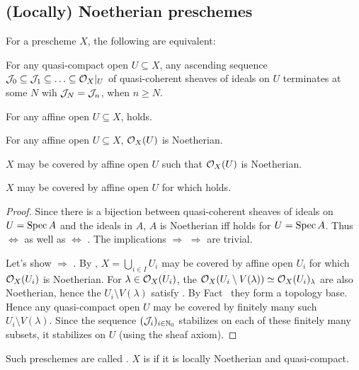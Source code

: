 \documentclass[a4paper,parskip=half,numbers=enddot, DIV=12]{scrreprt}
\begin{document}
\subsection{(Locally) Noetherian preschemes}

\begin{prop}
    For a prescheme $X$, the following are equivalent:
    \begin{alphanumerate}
    \item 
        For any quasi-compact open $U\subseteq X$, any ascending sequence $\mathcal{J}_0\subseteq \mathcal{J}_1\subseteq\ldots \subseteq \mathcal{O}_X|_U$ of quasi-coherent sheaves of ideals on $U$ terminates at some $N$ wih $\mathcal{J}_N= \mathcal{J}_n$, when $n\geq N$.
    \item 
        For any affine open $U\subseteq X$,  holds.
    \item 
        For any affine open $U\subseteq X$, $\mathcal{O}_X(U)$ is Noetherian.
    \item  
        $X$ may be covered by affine open $U$ such that $\mathcal{O}_X(U)$ is Noetherian.
    \item   
        $X$ may be covered by affine open $U$ for which  holds.
    \end{alphanumerate}
\end{prop}
\begin{proof}
    Since there is a bijection between quasi-coherent sheaves of ideals on $U=\operatorname{Spec} A$ and the ideals in $A$, $A$ is Noetherian iff  holds for $U=\operatorname{Spec} A$. Thus  $\Leftrightarrow$  as well as  $\Leftrightarrow$ . The implications  $\Rightarrow$  $\Rightarrow$  are trivial.  
    
    Let's show  $\Rightarrow$ . By , $X=\bigcup_{i\in I}U_i$ may be covered by affine open $U_i$ for which $\mathcal{O}_X(U_i)$ is Noetherian. For $\lambda\in\mathcal{O}_X(U_i)$, the $\mathcal{O}_X(U_i\setminus V(\lambda)) \simeq \mathcal{O}_X(U_i)_\lambda$ are also Noetherian, hence the $U_i\setminus V(\lambda)$ satisfy . By Fact~ they form a topology base. Hence any quasi-compact open $U$ may be covered by finitely many such $U_i\setminus V(\lambda)$. Since the sequence $(\mathcal{J}_i)_{i\in\mathbb{N}_0}$ stabilizes on each of these finitely many subsets, it stabilizes on $U$ (using the sheaf axiom).
\end{proof}
\begin{defi}
    Such preschemes are called . $X$ is  if it is locally Noetherian and quasi-compact.
\end{defi}
\end{document}
